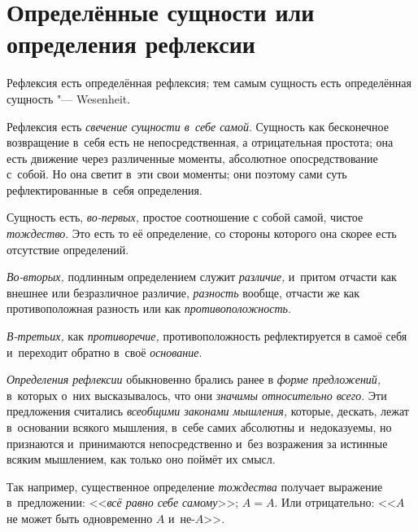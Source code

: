 \section{Определённые сущности или определения рефлексии}

Рефлексия есть определённая рефлексия; тем самым
сущность есть определённая сущность "--- Wesenheit.

Рефлексия есть {\em свечение сущности в~себе самой}.
Сущность как бесконечное возвращение в~себя есть не непосредственная, а
отрицательная простота; она есть движение через различенные моменты,
абсолютное опосредствование с~собой. Но она светит в~эти свои моменты; они
поэтому сами суть рефлектированные в~себя определения.

Сущность есть, {\em во-первых,} простое соотношение с
собой самой, чистое {\em тождество}. Это есть то её
определение, со стороны которого она скорее есть отсутствие определений.

{\em Во-вторых,} подлинным определением служит {\em различие,} и~притом
отчасти как внешнее или безразличное различие, {\em разность} вообще,
отчасти же как противоположная разность или как {\em противоположность}.

{\em В-третьих,} как {\em противоречие,} противоположность рефлектируется в
самоё себя и~переходит обратно в~своё {\em основание}.


{\em Определения рефлексии} обыкновенно брались ранее в
{\em форме предложений,} в~которых о~них высказывалось,
что они {\em значимы относительно всего}. Эти
предложения считались {\em всеобщими законами
мышления,} которые, дескать, лежат в~основании всякого мышления, в~себе
самих абсолютны и~недоказуемы, но признаются и~принимаются непосредственно
и~без возражения за истинные всяким мышлением, как только оно поймёт их смысл.

Так например, существенное определение {\em тождества}
получает выражение в~предложении: <<{\em всё равно себе
самому}>>; $A=A$. Или отрицательно: <<$A$ не может
быть одновременно $A$ и~не-$A$>>.

